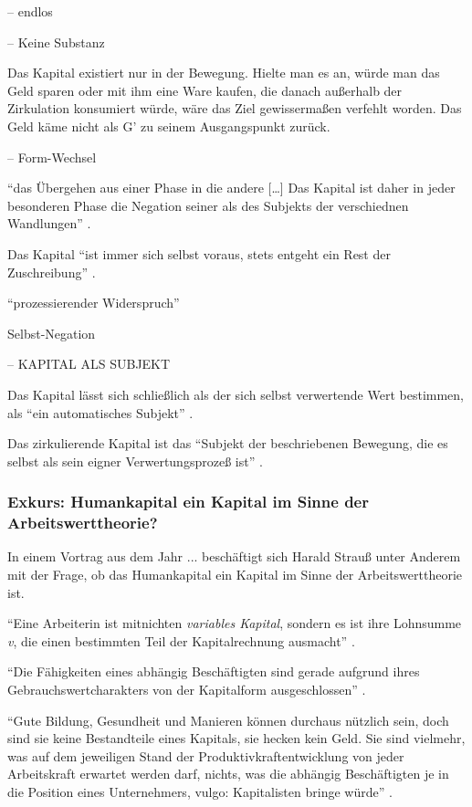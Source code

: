 \documentclass[12pt,
               DIV13,
               paper=a4,
               twoside=false,
               onehalfspacing,
               bibliography=totoc,
               toc=graduated,
               draft,
               ]{scrartcl}
\newcommand{\lips}{\dots\unkern}
\newcommand{\pc}[2]{\parencite[#1]{#2}}
\newcommand{\zn}[3]{\parencite[#1, zit. nach][#2]{#3}}
\begin{document}
-- endlos

-- Keine Substanz

Das Kapital existiert nur in der Bewegung. Hielte man es an, würde man
das Geld sparen oder mit ihm eine Ware kaufen, die danach außerhalb
der Zirkulation konsumiert würde, wäre das Ziel gewissermaßen verfehlt
worden. Das Geld käme nicht als G' zu seinem Ausgangspunkt zurück.

-- Form-Wechsel

"`das Übergehen aus einer Phase in die andere [\lips] Das Kapital ist
daher in jeder besonderen Phase die Negation seiner als des Subjekts
der verschiednen Wandlungen"' \zn{Marx}{181}{reichelt}.

Das Kapital "`ist immer sich selbst voraus, stets entgeht ein Rest der
Zuschreibung"' \pc{125}{strauss}.

"`prozessierender Widerspruch"'

Selbst-Negation

-- KAPITAL ALS SUBJEKT

Das Kapital lässt sich schließlich als der sich selbst verwertende
Wert bestimmen, als "`ein automatisches Subjekt"' \pc{169}{kap}.

Das zirkulierende Kapital ist das "`Subjekt der beschriebenen
Bewegung, die es selbst als sein eigner Verwertungsprozeß ist"'
\zn{Marx}{181}{reichelt}.

\subsubsection{Exkurs: Humankapital ein Kapital im Sinne der
Arbeitswerttheorie?}

In einem Vortrag aus dem Jahr ... beschäftigt sich Harald Strauß unter
Anderem mit der Frage, ob das Humankapital ein Kapital im Sinne der
Arbeitswerttheorie ist.

"`Eine Arbeiterin ist mitnichten \emph{variables Kapital}, sondern es
ist ihre Lohnsumme \emph{v}, die einen bestimmten Teil der
Kapitalrechnung ausmacht"' \pc{126}{strauss}.

"`Die Fähigkeiten eines abhängig Beschäftigten sind gerade aufgrund
ihres Gebrauchswertcharakters von der Kapitalform ausgeschlossen"'
\pc{126}{strauss}.

"`Gute Bildung, Gesundheit und Manieren können durchaus nützlich sein,
doch sind sie keine Bestandteile eines Kapitals, sie hecken kein Geld.
Sie sind vielmehr, was auf dem jeweiligen Stand der
Produktivkraftentwicklung von jeder Arbeitskraft erwartet werden darf,
nichts, was die abhängig Beschäftigten je in die Position eines
Unternehmers, vulgo: Kapitalisten bringe würde"' \pc{128}{strauss}.
\end{document}
